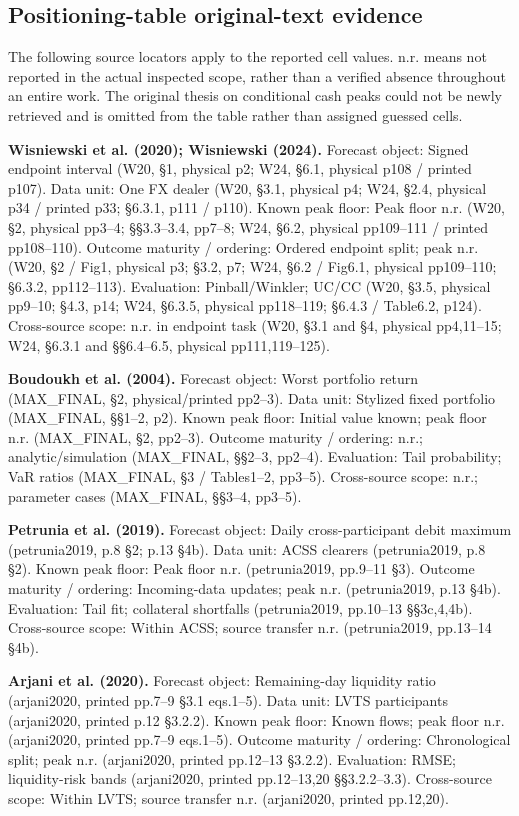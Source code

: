 \documentclass[11pt,a4paper]{article}
\begin{document}
\subsection*{Positioning-table original-text evidence}
The following source locators apply to the reported cell values. n.r. means not reported in the actual inspected scope, rather than a verified absence throughout an entire work. The original thesis on conditional cash peaks could not be newly retrieved and is omitted from the table rather than assigned guessed cells.

\textbf{Wisniewski et al. (2020); Wisniewski (2024).} Forecast object: Signed endpoint interval (W20, §1, physical p2; W24, §6.1, physical p108 / printed p107). Data unit: One FX dealer (W20, §3.1, physical p4; W24, §2.4, physical p34 / printed p33; §6.3.1, p111 / p110). Known peak floor: Peak floor n.r. (W20, §2, physical pp3--4; §§3.3--3.4, pp7--8; W24, §6.2, physical pp109--111 / printed pp108--110). Outcome maturity / ordering: Ordered endpoint split; peak n.r. (W20, §2 / Fig1, physical p3; §3.2, p7; W24, §6.2 / Fig6.1, physical pp109--110; §6.3.2, pp112--113). Evaluation: Pinball/Winkler; UC/CC (W20, §3.5, physical pp9--10; §4.3, p14; W24, §6.3.5, physical pp118--119; §6.4.3 / Table6.2, p124). Cross-source scope: n.r. in endpoint task (W20, §3.1 and §4, physical pp4,11--15; W24, §6.3.1 and §§6.4--6.5, physical pp111,119--125).

\textbf{Boudoukh et al. (2004).} Forecast object: Worst portfolio return (MAX\_FINAL, §2, physical/printed pp2--3). Data unit: Stylized fixed portfolio (MAX\_FINAL, §§1--2, p2). Known peak floor: Initial value known; peak floor n.r. (MAX\_FINAL, §2, pp2--3). Outcome maturity / ordering: n.r.; analytic/simulation (MAX\_FINAL, §§2--3, pp2--4). Evaluation: Tail probability; VaR ratios (MAX\_FINAL, §3 / Tables1--2, pp3--5). Cross-source scope: n.r.; parameter cases (MAX\_FINAL, §§3--4, pp3--5).

\textbf{Petrunia et al. (2019).} Forecast object: Daily cross-participant debit maximum (petrunia2019, p.8 §2; p.13 §4b). Data unit: ACSS clearers (petrunia2019, p.8 §2). Known peak floor: Peak floor n.r. (petrunia2019, pp.9--11 §3). Outcome maturity / ordering: Incoming-data updates; peak n.r. (petrunia2019, p.13 §4b). Evaluation: Tail fit; collateral shortfalls (petrunia2019, pp.10--13 §§3c,4,4b). Cross-source scope: Within ACSS; source transfer n.r. (petrunia2019, pp.13--14 §4b).

\textbf{Arjani et al. (2020).} Forecast object: Remaining-day liquidity ratio (arjani2020, printed pp.7--9 §3.1 eqs.1--5). Data unit: LVTS participants (arjani2020, printed p.12 §3.2.2). Known peak floor: Known flows; peak floor n.r. (arjani2020, printed pp.7--9 eqs.1--5). Outcome maturity / ordering: Chronological split; peak n.r. (arjani2020, printed pp.12--13 §3.2.2). Evaluation: RMSE; liquidity-risk bands (arjani2020, printed pp.12--13,20 §§3.2.2--3.3). Cross-source scope: Within LVTS; source transfer n.r. (arjani2020, printed pp.12,20).
\end{document}
